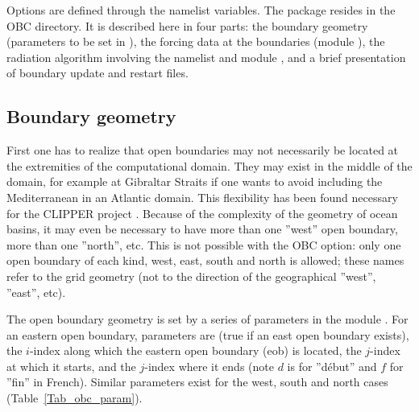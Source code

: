 Options are defined through the  namelist variables.
The package resides in the OBC directory. It is described here in four parts: the 
boundary geometry (parameters to be set in ), the forcing data at 
the boundaries (module ),  the radiation algorithm involving the 
namelist and module , and a brief presentation of boundary update 
and restart files.

\subsection{Boundary geometry}
\label{OBC_geom}
%
First one has to realize that open boundaries may not necessarily be located 
at the extremities of the computational domain. They may exist in the middle 
of the domain, for example at Gibraltar Straits if one wants to avoid including 
the Mediterranean in an Atlantic domain. This flexibility has been found necessary 
for the CLIPPER project \citep{Treguier_al_JGR01}. Because of the complexity of the 
geometry of ocean basins, it may even be necessary to have more than one 
''west'' open boundary, more than one ''north'', etc. This is not possible with 
the OBC option: only one open boundary of each kind, west, east, south and 
north is allowed; these names refer to the grid geometry (not to the direction 
of the geographical ''west'', ''east'', etc).

The open boundary geometry is set by a series of parameters in the module 
. For an eastern open boundary, parameters are  
(true if an east open boundary exists),  the $i$-index along which 
the eastern open boundary (eob) is located,  the $j$-index at which 
it starts, and  the $j$-index where it ends (note $d$ is for ''d\'{e}but'' 
and $f$ for ''fin'' in French). Similar parameters exist for the west, south and 
north cases (Table~\ref{Tab_obc_param}).


